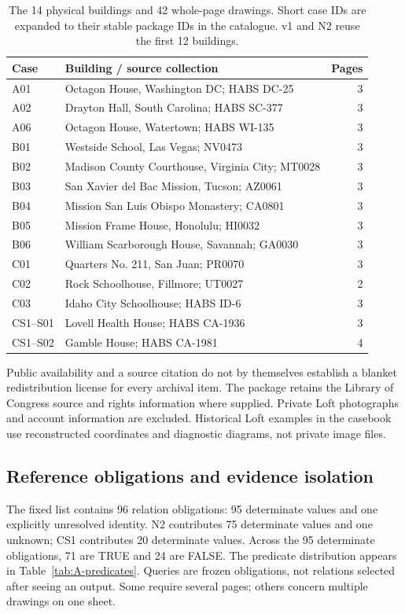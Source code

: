 \begin{table}[htbp]\centering\small
\begin{tabular}{p{.20\linewidth}p{.57\linewidth}r}
\toprule Case & Building / source collection & Pages\\\midrule
A01 & Octagon House, Washington DC; HABS DC-25 & 3\\
A02 & Drayton Hall, South Carolina; HABS SC-377 & 3\\
A06 & Octagon House, Watertown; HABS WI-135 & 3\\
B01 & Westside School, Las Vegas; NV0473 & 3\\
B02 & Madison County Courthouse, Virginia City; MT0028 & 3\\
B03 & San Xavier del Bac Mission, Tucson; AZ0061 & 3\\
B04 & Mission San Luis Obispo Monastery; CA0801 & 3\\
B05 & Mission Frame House, Honolulu; HI0032 & 3\\
B06 & William Scarborough House, Savannah; GA0030 & 3\\
C01 & Quarters No. 211, San Juan; PR0070 & 3\\
C02 & Rock Schoolhouse, Fillmore; UT0027 & 2\\
C03 & Idaho City Schoolhouse; HABS ID-6 & 3\\\midrule
CS1--S01 & Lovell Health House; HABS CA-1936 & 3\\
CS1--S02 & Gamble House; HABS CA-1981 & 4\\\bottomrule
\end{tabular}
\caption{The 14 physical buildings and 42 whole-page drawings. Short case IDs are expanded to their stable package IDs in the catalogue. v1 and N2 reuse the first 12 buildings.}\label{tab:A-catalogue}
\end{table}

Public availability and a source citation do not by themselves establish a blanket redistribution license for every archival item. The package retains the Library of Congress source and rights information where supplied. Private Loft photographs and account information are excluded. Historical Loft examples in the casebook use reconstructed coordinates and diagnostic diagrams, not private image files.

\subsection{Reference obligations and evidence isolation}
The fixed list contains 96 relation obligations: 95 determinate values and one explicitly unresolved identity. N2 contributes 75 determinate values and one unknown; CS1 contributes 20 determinate values. Across the 95 determinate obligations, 71 are TRUE and 24 are FALSE. The predicate distribution appears in Table~\ref{tab:A-predicates}. Queries are frozen obligations, not relations selected after seeing an output. Some require several pages; others concern multiple drawings on one sheet.

